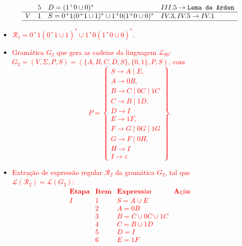 \documentclass[12pt]{article}
\def\myling{{99}} %
\begin{document}
\begin{itemize}
{$$\begin{array}{ccll}
      & 5 & D = (1^+0 \cup 0)^* & III.5 \rightarrow \texttt{Lema de Arden}\\
  \hline
    V & 1 & S = 0^+1(0^+1 \cup 1)^* \cup 1^+0(1^+0 \cup 0)^* & IV.3, IV.5 \rightarrow IV.1\\
  \hline
  \end{array}
  $$
  }
  \item  \textcolor{red}{$\mathcal{R}_1= 0^+1(0^+1 \cup 1)^* \cup 1^+0(1^+0 \cup 0)^*$.}
  \newpage
  \item  \textcolor{red}{Gramática $G_2$ que gera as cadeias da linguagem $\mathcal{L}_{\myling}$:\\ $G_2=(V,\Sigma,P,S)=(\{A,B,C,D,S\},\{0,1\},P,S)$, com
  $$
   P =
   \left\{\begin{array}{l}
    S \to A \mid E,\\
    A \to 0B,\\
    B \to C \mid 0C \mid 1C\\
    C \to B \mid 1D,\\
    D \to I\\
    E \to 1F,\\
    F \to G \mid 0G \mid 1G\\
    G \to F \mid 0H,\\
    H \to I\\
    I \to \varepsilon
   \end{array}\right\}.
  $$
  }
  \item  \textcolor{red}{Extração de expressão regular $\mathcal{R}_2$ da gramática $G_2$, tal que $\mathcal{L}(\mathcal{R}_2)=\mathcal{L}(G_2)$:\\
  $$
  \begin{array}{ccll}
  \hline
  \textbf{Etapa} & \textbf{Item} & \textbf{Expressão} & \textbf{Ação}\\
  \hline
    I & 1 & S = A \cup E &\\
      & 2 & A = 0B &\\
      & 3 & B = C \cup 0C \cup 1C&\\
      & 4 & C = B \cup 1D &\\
      & 5 & D = I&\\
      & 6 & E = 1F&\\

\end{array}$$}
\end{itemize}
\end{document}
